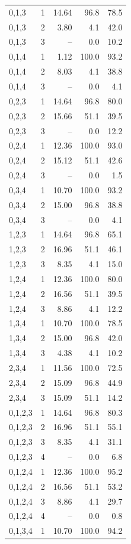 \documentclass[11pt]{article}
\begin{document}
\begin{longtable}{@{}lrrrr@{}}
0,1,3 & 1 & 14.64 & 96.8 & 78.5\\
0,1,3 & 2 & 3.80 & 4.1 & 42.0\\
0,1,3 & 3 & -- & 0.0 & 10.2\\
0,1,4 & 1 & 1.12 & 100.0 & 93.2\\
0,1,4 & 2 & 8.03 & 4.1 & 38.8\\
0,1,4 & 3 & -- & 0.0 & 4.1\\
0,2,3 & 1 & 14.64 & 96.8 & 80.0\\
0,2,3 & 2 & 15.66 & 51.1 & 39.5\\
0,2,3 & 3 & -- & 0.0 & 12.2\\
0,2,4 & 1 & 12.36 & 100.0 & 93.0\\
0,2,4 & 2 & 15.12 & 51.1 & 42.6\\
0,2,4 & 3 & -- & 0.0 & 1.5\\
0,3,4 & 1 & 10.70 & 100.0 & 93.2\\
0,3,4 & 2 & 15.00 & 96.8 & 38.8\\
0,3,4 & 3 & -- & 0.0 & 4.1\\
1,2,3 & 1 & 14.64 & 96.8 & 65.1\\
1,2,3 & 2 & 16.96 & 51.1 & 46.1\\
1,2,3 & 3 & 8.35 & 4.1 & 15.0\\
1,2,4 & 1 & 12.36 & 100.0 & 80.0\\
1,2,4 & 2 & 16.56 & 51.1 & 39.5\\
1,2,4 & 3 & 8.86 & 4.1 & 12.2\\
1,3,4 & 1 & 10.70 & 100.0 & 78.5\\
1,3,4 & 2 & 15.00 & 96.8 & 42.0\\
1,3,4 & 3 & 4.38 & 4.1 & 10.2\\
2,3,4 & 1 & 11.56 & 100.0 & 72.5\\
2,3,4 & 2 & 15.09 & 96.8 & 44.9\\
2,3,4 & 3 & 15.09 & 51.1 & 14.2\\
0,1,2,3 & 1 & 14.64 & 96.8 & 80.3\\
0,1,2,3 & 2 & 16.96 & 51.1 & 55.1\\
0,1,2,3 & 3 & 8.35 & 4.1 & 31.1\\
0,1,2,3 & 4 & -- & 0.0 & 6.8\\
0,1,2,4 & 1 & 12.36 & 100.0 & 95.2\\
0,1,2,4 & 2 & 16.56 & 51.1 & 53.2\\
0,1,2,4 & 3 & 8.86 & 4.1 & 29.7\\
0,1,2,4 & 4 & -- & 0.0 & 0.8\\
0,1,3,4 & 1 & 10.70 & 100.0 & 94.2\\

\end{longtable}
\end{document}
